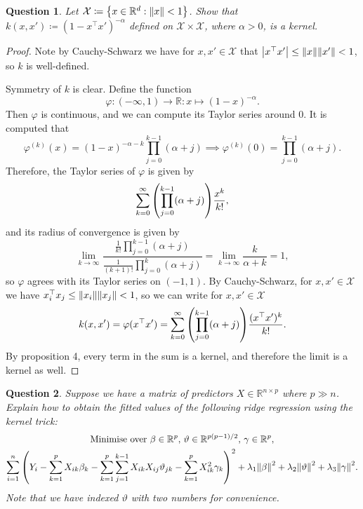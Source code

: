 \documentclass{article}
\theoremstyle{plain}
\newtheorem{question}{Question}
\theoremstyle{remark}
\renewcommand{\theta}{\vartheta}
\renewcommand{\phi}{\varphi}
\newcommand{\Bb}{\mathbb}
\newcommand{\Cal}{\mathcal}
\newcommand{\RR}{\Bb R}
\newcommand\XX{\Cal X}
\newcommand{\T}{^\top} %
\newcommand\ceq\coloneqq %
\begin{document}
\begin{question}
	Let $\XX \ceq \qty{x \in \RR^d : \norm{x} < 1}$. Show that $k(x, x') \ceq (1 - x\T x')^{-\alpha}$ defined on $\XX \times \XX$, where $\alpha > 0$, is a kernel.
\end{question}

\begin{proof}
	Note by Cauchy-Schwarz we have for $x, x' \in \XX$ that $\abs{x\T x'} \leq \norm{x} \norm{x'} < 1$, so $k$ is well-defined. 
	
	Symmetry of $k$ is clear. Define the function 
	\[
	\phi \colon (-\infty, 1) \to \RR \colon x \mapsto (1-x)^{-\alpha}. 
	\]
	Then $\phi$ is continuous, and we can compute its Taylor series around 0. It is computed that 
	\[
	\phi^{(k)}(x) = (1-x)^{-\alpha - k} \prod_{j=0}^{k-1}(\alpha + j) \implies \phi^{(k)}(0) = \prod_{j=0}^{k-1} (\alpha + j). 	\]
	Therefore, the Taylor series of $\phi$ is given by
	\[
	\sum_{k=0}^\infty \qty(\prod_{j=0}^{k-1} (\alpha + j)) \frac{x^k}{k!}, 
	\]
	and its radius of convergence is given by
	\[
	\lim_{k\to\infty} \frac{\frac{1}{k!}\prod_{j=0}^{k-1} (\alpha + j)}{\frac{1}{(k+1)!} \prod_{j=0}^k (\alpha + j)} = \lim_{k\to\infty} \frac{k}{\alpha + k} = 1,
	\]
	so $\phi$ agrees with its Taylor series on $(-1, 1)$. By Cauchy-Schwarz, for $x, x' \in \XX$ we have $x_i\T x_j \leq \norm{x_i} \norm{x_j} < 1$, so we can write for $x, x' \in \XX$
	\[
	k(x, x') = \phi(x\T x') = \sum_{k=0}^\infty \qty(\prod_{j=0}^{k-1} (\alpha + j)) \frac{(x\T x')^k}{k!}.
	\]
	By proposition 4, every term in the sum is a kernel, and therefore the limit is a kernel as well. 
\end{proof}


\begin{question}
	Suppose we have a matrix of predictors $X \in \RR^{n \times p}$ where $p \gg n$. Explain how to obtain the fitted values of the following ridge regression using the kernel trick:
	\begin{gather*}
		\text{Minimise over $\beta \in \RR^p$, $\theta \in \RR^{p(p-1)/2}$, $\gamma \in \RR^p$,} \\
		\sum_{i=1}^n \qty(Y_i - \sum_{k=1}^p X_{ik}\beta_k - \sum_{k=1}^p \sum_{j=1}^{k-1} X_{ik} X_{ij} \theta_{jk} - \sum_{k=1}^p X_{ik}^2\gamma_k)^2 + \lambda_1 \norm{\beta}^2 + \lambda_2 \norm{\theta}^2 + \lambda_3\norm{\gamma}^2. 
	\end{gather*}
Note that we have indexed $\theta$ with two numbers for convenience. 
\end{question}
\end{document}
